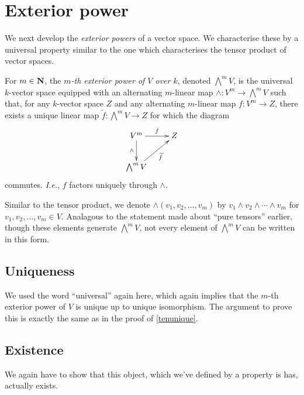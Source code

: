 
\section{Exterior power}

We next develop the \emph{exterior powers} of a vector space. We characterise these by a universal property similar to the one which characterises the tensor product of vector spaces.

\begin{dfn}
  For $m \in \boldsymbol{\mathbf{N}}$, the \textit{$m$-th exterior power of $V$ over $k$}, denoted $\bigwedge^m V$, is the universal $k$-vector space equipped with an alternating $m$-linear map $\wedge : V^m \to \bigwedge^m V$ such that, for any $k$-vector space $Z$ and any alternating $m$-linear map $f: V^m \to Z$, there exists a unique linear map $\tilde f: \bigwedge^m V \to Z$ for which the diagram
\[ \xymatrix{ V^m \ar[d]_-\wedge \ar[r]^-{f} & Z \\ \bigwedge^m V \ar[ur]_-{\tilde f} } \]
commutes. \emph{I.e.}, $f$ factors uniquely through $\wedge$.
\end{dfn}

\begin{ntn}
  Similar to the tensor product, we denote $\wedge(v_1,v_2,\ldots,v_m)$ by $v_1 \wedge v_2 \wedge \cdots \wedge v_m$ for $v_1,v_2,\ldots,v_m \in V$. Analagous to the statement made about ``pure tensors'' earlier, though these elements generate $\bigwedge^m V$, not every element of $\bigwedge^m V$ can be written in this form.
\end{ntn}

\subsection{Uniqueness}

We used the word ``universal'' again here, which again implies that the $m$-th exterior power of $V$ is unique up to unique isomorphism. The argument to prove this is exactly the same as in the proof of \ref{tenunique}.

\subsection{Existence}

We again have to show that this object, which we've defined by a property is has, actually exists.

